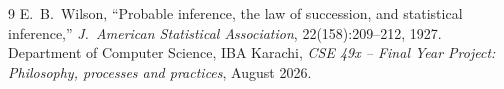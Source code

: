 \documentclass[11pt,a4paper]{article}
\begin{document}
\begin{thebibliography}{9}
 E.~B.~Wilson, ``Probable inference, the law of succession, and statistical inference,'' \emph{J.\ American Statistical Association}, 22(158):209--212, 1927.
 Department of Computer Science, IBA Karachi, \emph{CSE 49x -- Final Year Project: Philosophy, processes and practices}, August 2026.
\end{thebibliography}
\end{document}
